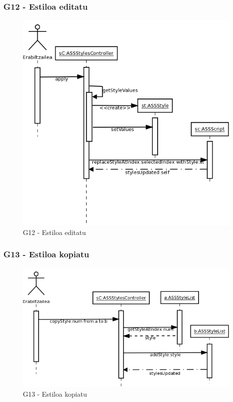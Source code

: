 \subsubsection{G12 - Estiloa editatu}
\begin{figure}[htp]
\begin{center}
\includegraphics[scale=0.3]{Pictures/Chapter4/Diseinua/G12.png}
\caption{G12 - Estiloa editatu}
\label{g12d}
\end{center}
\end{figure}


\subsubsection{G13 - Estiloa kopiatu}
\begin{figure}[htp]
\begin{center}
\includegraphics[scale=0.35]{Pictures/Chapter4/Diseinua/G13.png}
\caption{G13 - Estiloa kopiatu}
\label{g13d}
\end{center}
\end{figure}

